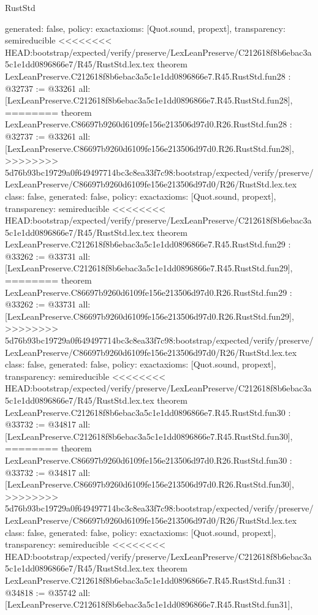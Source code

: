 \begin{lexlean}{RustStd}
\begin{coremodule}
{\begin{coremodule}
{{{{{{{{{{{{{{{{{{{{{{{{{{{{{{{  generated: false,
  policy: exact{axioms: [Quot.sound, propext]},
  transparency: semireducible
}
<<<<<<<< HEAD:bootstrap/expected/verify/preserve/LexLeanPreserve/C212618f8b6ebac3a5c1e1dd0896866e7/R45/RustStd.lex.tex
theorem LexLeanPreserve.C212618f8b6ebac3a5c1e1dd0896866e7.R45.RustStd.fun28 : @32737 := @33261 {
  all: [LexLeanPreserve.C212618f8b6ebac3a5c1e1dd0896866e7.R45.RustStd.fun28],
========
theorem LexLeanPreserve.C86697b9260d6109fe156e213506d97d0.R26.RustStd.fun28 : @32737 := @33261 {
  all: [LexLeanPreserve.C86697b9260d6109fe156e213506d97d0.R26.RustStd.fun28],
>>>>>>>> 5d76b93bc19729a0f649497714bc3c8ea33f7c98:bootstrap/expected/verify/preserve/LexLeanPreserve/C86697b9260d6109fe156e213506d97d0/R26/RustStd.lex.tex
  class: false,
  generated: false,
  policy: exact{axioms: [Quot.sound, propext]},
  transparency: semireducible
}
<<<<<<<< HEAD:bootstrap/expected/verify/preserve/LexLeanPreserve/C212618f8b6ebac3a5c1e1dd0896866e7/R45/RustStd.lex.tex
theorem LexLeanPreserve.C212618f8b6ebac3a5c1e1dd0896866e7.R45.RustStd.fun29 : @33262 := @33731 {
  all: [LexLeanPreserve.C212618f8b6ebac3a5c1e1dd0896866e7.R45.RustStd.fun29],
========
theorem LexLeanPreserve.C86697b9260d6109fe156e213506d97d0.R26.RustStd.fun29 : @33262 := @33731 {
  all: [LexLeanPreserve.C86697b9260d6109fe156e213506d97d0.R26.RustStd.fun29],
>>>>>>>> 5d76b93bc19729a0f649497714bc3c8ea33f7c98:bootstrap/expected/verify/preserve/LexLeanPreserve/C86697b9260d6109fe156e213506d97d0/R26/RustStd.lex.tex
  class: false,
  generated: false,
  policy: exact{axioms: [Quot.sound, propext]},
  transparency: semireducible
}
<<<<<<<< HEAD:bootstrap/expected/verify/preserve/LexLeanPreserve/C212618f8b6ebac3a5c1e1dd0896866e7/R45/RustStd.lex.tex
theorem LexLeanPreserve.C212618f8b6ebac3a5c1e1dd0896866e7.R45.RustStd.fun30 : @33732 := @34817 {
  all: [LexLeanPreserve.C212618f8b6ebac3a5c1e1dd0896866e7.R45.RustStd.fun30],
========
theorem LexLeanPreserve.C86697b9260d6109fe156e213506d97d0.R26.RustStd.fun30 : @33732 := @34817 {
  all: [LexLeanPreserve.C86697b9260d6109fe156e213506d97d0.R26.RustStd.fun30],
>>>>>>>> 5d76b93bc19729a0f649497714bc3c8ea33f7c98:bootstrap/expected/verify/preserve/LexLeanPreserve/C86697b9260d6109fe156e213506d97d0/R26/RustStd.lex.tex
  class: false,
  generated: false,
  policy: exact{axioms: [Quot.sound, propext]},
  transparency: semireducible
}
<<<<<<<< HEAD:bootstrap/expected/verify/preserve/LexLeanPreserve/C212618f8b6ebac3a5c1e1dd0896866e7/R45/RustStd.lex.tex
theorem LexLeanPreserve.C212618f8b6ebac3a5c1e1dd0896866e7.R45.RustStd.fun31 : @34818 := @35742 {
  all: [LexLeanPreserve.C212618f8b6ebac3a5c1e1dd0896866e7.R45.RustStd.fun31],
}}}}}}}}}}}}}}}}}}}}}}}}}}}}}}}}}}
\end{coremodule}}
\end{coremodule}
\end{lexlean}
